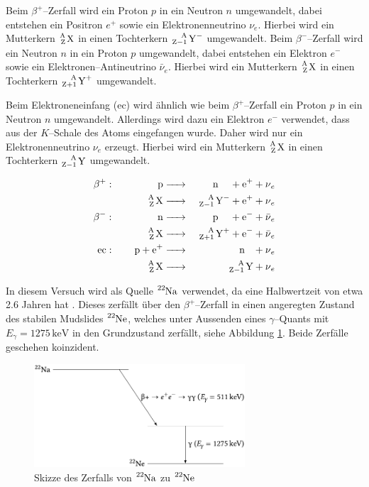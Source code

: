 \documentclass[12pt,a4paper]{scrartcl}
\numberwithin{equation}{section} %
\newcommand{\pu}[1]{\ensuremath{\mathrm{#1}}}
\begin{document}
Beim $\beta^+$--Zerfall wird ein Proton $p$ in ein Neutron $n$ umgewandelt, dabei entstehen ein Positron $e^+$ sowie ein Elektronenneutrino $\nu_e$. Hierbei wird ein Mutterkern $\ce{^A_Z X}$ in einen Tochterkern $\ce{^A_{Z-1} Y^-}$ umgewandelt. Beim $\beta^-$--Zerfall wird ein Neutron $n$ in ein Proton $p$ umgewandelt, dabei entstehen ein Elektron $e^-$ sowie ein Elektronen--Antineutrino $\bar{\nu}_e$. Hierbei wird ein Mutterkern $\ce{^A_Z X}$ in einen Tochterkern $\ce{^A_{Z+1} Y^+}$ umgewandelt.

Beim Elektroneneinfang (ec) wird ähnlich wie beim $\beta^+$--Zerfall ein Proton $p$ in ein Neutron $n$ umgewandelt. Allerdings wird dazu ein Elektron $e^-$ verwendet, dass aus der $K$--Schale des Atoms eingefangen wurde. Daher wird nur ein Elektronenneutrino $\nu_e$ erzeugt. Hierbei wird ein Mutterkern $\ce{^A_Z X}$ in einen Tochterkern $\ce{^A_{Z-1} Y}$ umgewandelt.

\begin{eqnarray}
    \beta^+:\qquad\,\,\qquad
        \ce{p} &\ce{->}& \quad \ce{n} \quad\, + \ce{e^+} + \ce{\nu_e} \\
        \ce{^A_Z X} &\ce{->}& \ce{^A_{Z-1} Y^-} + \ce{e^+} + \ce{\nu_e} \\
    \beta^-:\qquad\,\,\qquad
        \ce{n} &\ce{->}& \quad \ce{p} \quad\, + \ce{e^-} + \ce{\bar{\nu}_e} \\
        \ce{^A_Z X} &\ce{->}& \ce{^A_{Z+1} Y^+} + \ce{e^-} + \ce{\bar{\nu}_e} \\
    \text{ec}:\qquad
        \ce{p + e^+} &\ce{->}& \quad \ce{n} \ \ \, + \ce{\nu_e} \\
        \ce{^A_Z X} &\ce{->}& \ce{^A_{Z-1} Y} + \ce{\nu_e}
\end{eqnarray}

\noindent
In diesem Versuch wird als Quelle $\ce{^{22}Na}$ verwendet, da eine Halbwertzeit von etwa 2.6 Jahren hat \cite{NuclideChart}. Dieses zerfällt über den $\beta^+$--Zerfall in einen angeregten Zustand des stabilen Mudslides $\ce{^{22}Ne}$, welches unter Aussenden eines $\gamma$--Quants mit $E_\gamma = \pu{1275\, keV}$ in den Grundzustand zerfällt, siehe Abbildung \ref{abb:Skizze 22Na}. Beide Zerfälle geschehen koinzident.

\begin{figure}[h]
	\centering
	\includegraphics[width=0.7\textwidth]{../media/B3.4/Zerfall_22_Na.pdf}
	\caption{Skizze des Zerfalls von $\ce{^{22}Na}$ zu $\ce{^{22}Ne}$ \cite{UzK}}
	\label{abb:Skizze 22Na}
\end{figure}
\end{document}
